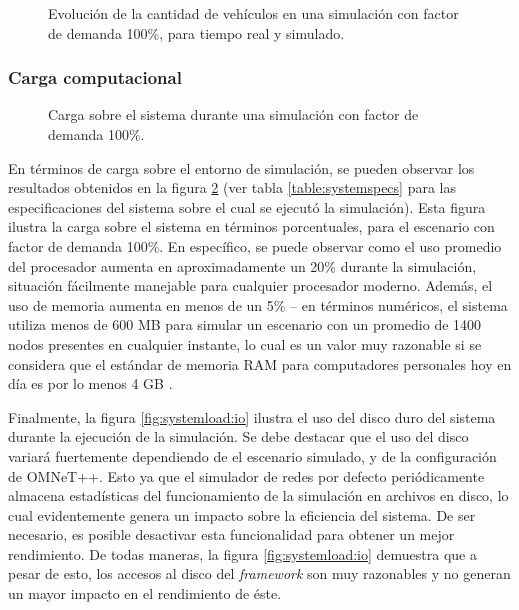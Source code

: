 \begin{figure}[tpb]
    \centering
    
    \caption[Evolución temporal de la cantidad de vehículos en la simulación.]{Evolución de la cantidad de vehículos en una simulación con factor de demanda 100\%, para tiempo real y simulado.}
    \label{fig:timevsvehicles_evolution}
\end{figure}

\subsubsection{Carga computacional}

\begin{figure}[tpb]
    \centering
    
    \caption[Carga sobre el sistema durante una simulación]{Carga sobre el sistema durante una simulación con factor de demanda 100\%.}
    \label{fig:systemload:cpuram}
\end{figure}

En términos de carga sobre el entorno de simulación, se pueden observar los resultados obtenidos en la figura \ref{fig:systemload:cpuram} (ver tabla \ref{table:systemspecs} para las especificaciones del sistema sobre el cual se ejecutó la simulación). Esta figura ilustra la carga sobre el sistema en términos porcentuales, para el escenario con factor de demanda 100\%. En específico, se puede observar como el uso promedio del procesador aumenta en aproximadamente un 20\% durante la simulación, situación fácilmente manejable para cualquier procesador moderno. Además, el uso de memoria aumenta en menos de un 5\% -- en términos numéricos, el sistema utiliza menos de 600 MB para simular un escenario con un promedio de 1400 nodos presentes en cualquier instante, lo cual es un valor muy razonable si se considera que el estándar de memoria RAM para computadores personales hoy en día es por lo menos 4 GB \autocite{steamhwsurvey, unityhardwaresurvey}.

Finalmente, la figura \ref{fig:systemload:io} ilustra el uso del disco duro del sistema durante la ejecución de la simulación. Se debe destacar que el uso del disco variará fuertemente dependiendo de el escenario simulado, y de la configuración de OMNeT++. Esto ya que el simulador de redes por defecto periódicamente almacena estadísticas del funcionamiento de la simulación en archivos en disco, lo cual evidentemente genera un impacto sobre la eficiencia del sistema. De ser necesario, es posible desactivar esta funcionalidad para obtener un mejor rendimiento. De todas maneras, la figura \ref{fig:systemload:io} demuestra que a pesar de esto, los accesos al disco del \emph{framework} son muy razonables y no generan un mayor impacto en el rendimiento de éste.

